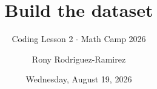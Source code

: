 \title[API 209 \(\cdot\) MATH CAMP 2026 \(\cdot\) LESSON 2]{Build the dataset}
\subtitle{Coding Lesson 2 \(\cdot\) Math Camp 2026}
\author{Rony Rodriguez-Ramirez}
\date{Wednesday, August 19, 2026}
